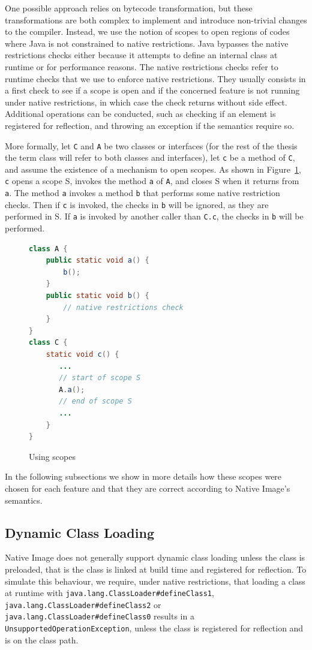 One possible approach relies on bytecode transformation, but these transformations are both complex to implement and introduce non-trivial changes to the compiler. 
Instead, we use the notion of scopes to open regions of codes where Java is not constrained to native restrictions.
Java bypasses the native restrictions checks either because it attempts to define an internal class at runtime or for performance reasons.
The native restrictions checks refer to runtime checks that we use to enforce native restrictions. They usually consists in a first check to see if a scope is open and if the concerned feature is not running under native restrictions, in which case the check returns without side effect. Additional operations can be conducted, such as checking if an element is registered for reflection, and throwing an exception if
the semantics require so. 

More formally, let \verb|C| and \verb|A| be two classes or interfaces (for the rest of the thesis the term class will refer to both classes and interfaces), let \verb|c| be a method of \verb|C|, and assume the existence of a mechanism to open scopes. As shown in Figure~\ref{fig:scopes}, \verb|c| opens a scope S, invokes the method \verb|a| of \verb|A|, and closes S when it returns from \verb|a|.
The method \verb|a| invokes a method \verb|b| that performs some native restriction checks.
Then if \verb|c| is invoked, the checks in \verb|b| will be ignored, as they are performed in S.
If \verb|a| is invoked by another caller than \verb|C.c|, the checks in \verb|b| will be performed.

\begin{figure}[ht]
    \centering
\begin{lstlisting}[language=Java]
class A {
    public static void a() {
        b(); 
    }
    public static void b() {
        // native restrictions check
    }
} 
class C {
    static void c() {
       ...
       // start of scope S
       A.a();
       // end of scope S
       ...
    }
}
\end{lstlisting}
    \caption{Using scopes}
    \label{fig:scopes}
\end{figure}

In the following subsections we show in more details how these scopes were chosen for each feature and that they are correct according to Native Image's semantics.

\subsection{Dynamic Class Loading}
Native Image does not generally support dynamic class loading unless the class is preloaded, that is the class is linked at build time and registered for reflection.
To simulate this behaviour, we require, under native restrictions, that loading a class at runtime with \verb|java.lang.ClassLoader#defineClass1|, \verb|java.lang.ClassLoader#defineClass2| or \verb|java.lang.ClassLoader#defineClass0| results in a \verb|UnsupportedOperationException|, unless the class is registered for reflection and is on the class path.


